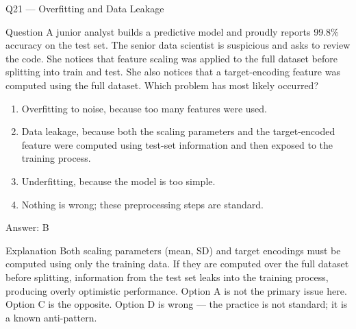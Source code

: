 \documentclass[aspectratio=169,8pt]{beamer}
\begin{document}
	
	\begin{frame}{Q21 --- Overfitting and Data Leakage}
		\begin{block}{Question}
			A junior analyst builds a predictive model and proudly reports 99.8\% accuracy on the test set. The senior data scientist is suspicious and asks to review the code. She notices that feature scaling was applied to the full dataset before splitting into train and test. She also notices that a target-encoding feature was computed using the full dataset. Which problem has most likely occurred?
		\end{block}
		\begin{enumerate}
			\item Overfitting to noise, because too many features were used.
			\item Data leakage, because both the scaling parameters and the target-encoded feature were computed using test-set information and then exposed to the training process.
			\item Underfitting, because the model is too simple.
			\item Nothing is wrong; these preprocessing steps are standard.
		\end{enumerate}
		\begin{exampleblock}{Answer: B}\end{exampleblock}
		\begin{block}{Explanation}
			Both scaling parameters (mean, SD) and target encodings must be computed using only the training data. If they are computed over the full dataset before splitting, information from the test set leaks into the training process, producing overly optimistic performance. Option A is not the primary issue here. Option C is the opposite. Option D is wrong --- the practice is not standard; it is a known anti-pattern.
		\end{block}
	\end{frame}
	
\end{document}
